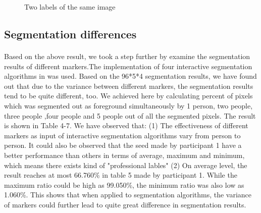 \documentclass[runningheads,a4paper]{llncs}
\begin{document}
\begin{figure}
\centering

\caption{Two labels of the same image}     
\label{fig:example}     
\end{figure}


\subsection{Segmentation differences}
\paragraph{}Based on the above result, we took a step further by examine the segmentation results of different markers.The implementation of four interactive segmentation algorithms in \citep{gulshan2010geodesic} was used. Based on the 96*5*4 segmentation results, we have found out that due to the variance between different markers, the segmentation results tend to be quite different, too.  We achieved here by calculating percent of pixels which was segmented out as foreground simultaneously by 1 person, two people, three people ,four people and 5 people out of all the segmented pixels. The result is shown in Table 4-7. We have observed that: (1) The effectiveness of different markers as input of interactive segmentation algorithms vary from person to person.  It could also be observed that the seed made by participant 1 have a better performance than others in terms of average, maximum and minimum, which means there exists kind of "professional lables" \citep{fu2008saliency} (2) On average level, the result reaches at most 66.760\% in table 5 made by participant 1. While the maximum ratio could be high as 99.050\%, the minimum ratio was also low as 1.060\%. This shows that when applied to segmentation algorithms, the variance of markers could further lead to quite great difference in segmentation results. 
\end{document}

